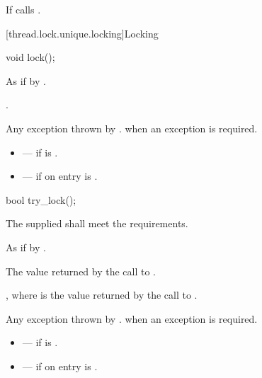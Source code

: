 \begin{itemdescr}
\pnum
\effects
If  calls .
\end{itemdescr}

[thread.lock.unique.locking]{Locking}

%
\begin{itemdecl}
void lock();
\end{itemdecl}

\begin{itemdescr}
\pnum
\effects
As if by .

\pnum
\ensures
{}.

\pnum
\throws
Any exception thrown by .  when an exception
is required.

\pnum
\errors
\begin{itemize}
\item {} --- if  is .
\item {} --- if on entry 
is .
\end{itemize}
\end{itemdescr}

%
\begin{itemdecl}
bool try_lock();
\end{itemdecl}

\begin{itemdescr}
\pnum
\requires The supplied  shall meet the 
requirements.

\pnum
\effects
As if by .

\pnum
\returns
The value returned by the call to .

\pnum
\ensures
{}, where  is the value returned by
the call to .

\pnum
\throws
Any exception thrown by .  when an exception
is required.

\pnum
\errors
\begin{itemize}
\item {} --- if  is .
\item {} --- if on entry 
is .
\end{itemize}
\end{itemdescr}

